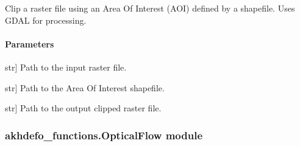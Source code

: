 \documentclass[letterpaper,10pt,english]{sphinxmanual}
\begin{document}
\begin{fulllineitems}
\label{\detokenize{akhdefo_functions:akhdefo_functions.Mosaic_Crop.rasterClip}}
\pysigstartsignatures
{}
\pysigstopsignatures
\sphinxAtStartPar
Clip a raster file using an Area Of Interest (AOI) defined by a shapefile.
Uses GDAL for processing.


\paragraph{Parameters}
\label{\detokenize{akhdefo_functions:id32}}\begin{description}
\sphinxlineitem{rasterpath}{[}str{]}
\sphinxAtStartPar
Path to the input raster file.

\sphinxlineitem{aoi}{[}str{]}
\sphinxAtStartPar
Path to the Area Of Interest shapefile.

\sphinxlineitem{outfilename}{[}str{]}
\sphinxAtStartPar
Path to the output clipped raster file.

\end{description}

\end{fulllineitems}



\subsubsection{akhdefo\_functions.OpticalFlow module}
\label{\detokenize{akhdefo_functions:module-akhdefo_functions.OpticalFlow}}\label{\detokenize{akhdefo_functions:akhdefo-functions-opticalflow-module}}
\end{document}
